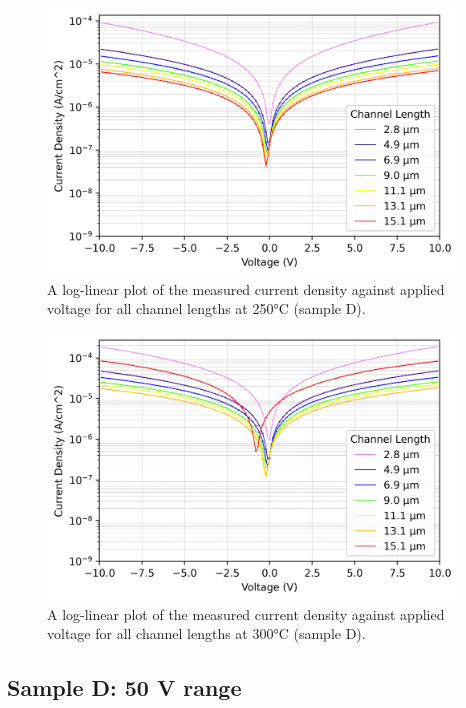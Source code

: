 \begin{figure}[h]
    \centering
    \includegraphics[width=0.97\textwidth]{Chapter6/Figs/Raster/Sample D 2019/10V_Current_Density_vs_Voltage_Temperature_250_log.png}
    \caption{A log-linear plot of the measured current density against applied voltage for all channel lengths at 250\si{\degreeCelsius} (sample D).}
    \label{appfig:10V_D_current_density_250}
\end{figure}
\begin{figure}[h]
    \centering
    \includegraphics[width=0.97\textwidth]{Chapter6/Figs/Raster/Sample D 2019/10V_Current_Density_vs_Voltage_Temperature_300_log.png}
    \caption{A log-linear plot of the measured current density against applied voltage for all channel lengths at 300\si{\degreeCelsius} (sample D).}
    \label{appfig:10V_D_current_density_300}
\end{figure}

\subsection{Sample D: 50 \si{\volt} range}

